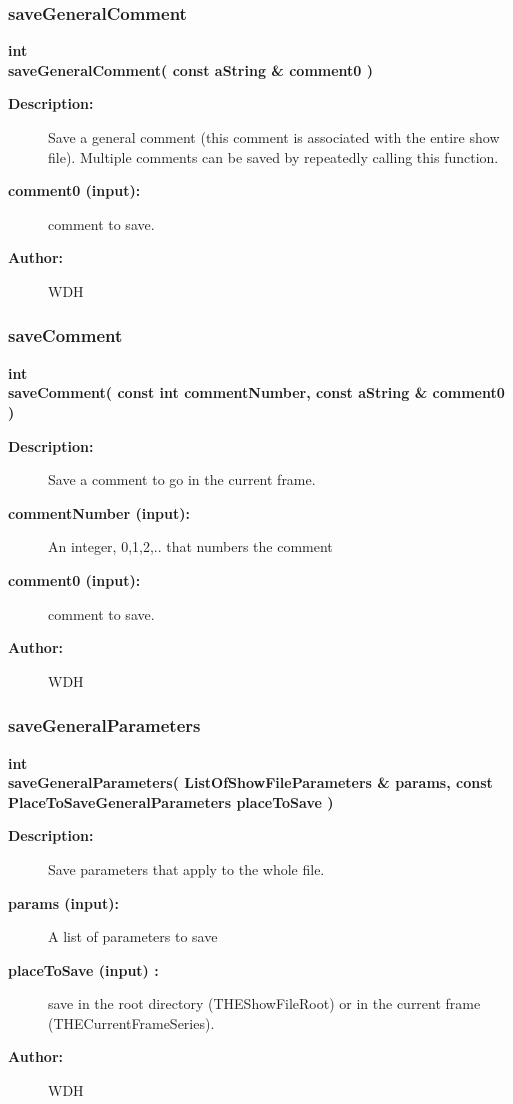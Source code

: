 \subsubsection{saveGeneralComment}
 
\begin{flushleft} \textbf{%
int  \\ 
\settowidth{\OgshowIncludeArgIndent}{saveGeneralComment(}%
saveGeneralComment( const aString \& comment0 )
}\end{flushleft}
\begin{description}
\item[{\bf Description:}] 
   Save a general comment (this comment is associated with the entire show file).
   Multiple comments can be saved by repeatedly calling this function.
\item[{\bf comment0 (input):}]  comment to save.
\item[{\bf Author:}]  WDH
\end{description}
\subsubsection{saveComment}
 
\begin{flushleft} \textbf{%
int  \\ 
\settowidth{\OgshowIncludeArgIndent}{saveComment(}%
saveComment( const int commentNumber, const aString \& comment0 )
}\end{flushleft}
\begin{description}
\item[{\bf Description:}] 
   Save a comment to go in the current frame.
\item[{\bf commentNumber (input):}]  An integer, 0,1,2,.. that numbers the comment
\item[{\bf comment0 (input):}]  comment to save.
\item[{\bf Author:}]  WDH
\end{description}
\subsubsection{saveGeneralParameters}
 
\begin{flushleft} \textbf{%
int  \\ 
\settowidth{\OgshowIncludeArgIndent}{saveGeneralParameters(}%
saveGeneralParameters( ListOfShowFileParameters \& params, const PlaceToSaveGeneralParameters placeToSave )
}\end{flushleft}
\begin{description}
\item[{\bf Description:}] 
   Save parameters that apply to the whole file.
\item[{\bf params (input):}]  A list of parameters to save
\item[{\bf placeToSave (input) :}]  save in the root directory (THEShowFileRoot) or in the current frame (THECurrentFrameSeries).
\item[{\bf Author:}]  WDH
\end{description}
